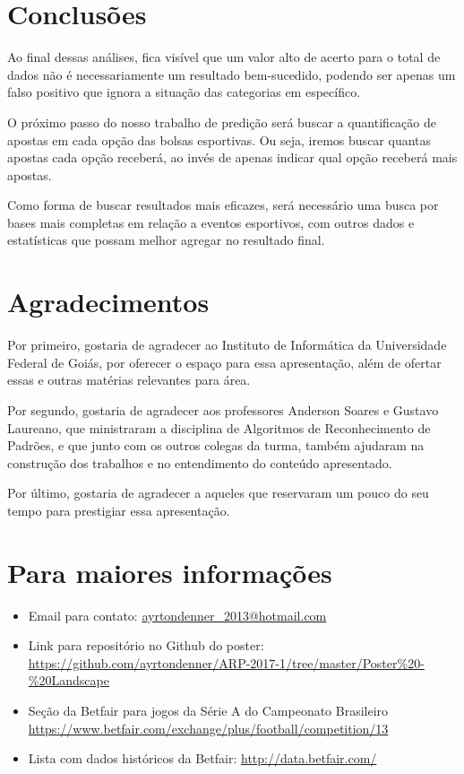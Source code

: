 \documentclass[thesis]{hmcposter}
\begin{document}
\begin{poster}
\section{Conclusões}

Ao final dessas análises, fica visível que um valor alto de acerto para o total de dados não é necessariamente um resultado bem-sucedido, podendo ser apenas um falso positivo que ignora a situação das categorias em específico.

O próximo passo do nosso trabalho de predição será buscar a quantificação de apostas em cada opção das bolsas esportivas. Ou seja, iremos buscar quantas apostas cada opção receberá, ao invés de apenas indicar qual opção receberá mais apostas.

Como forma de buscar resultados mais eficazes, será necessário uma busca por bases mais completas em relação a eventos esportivos, com outros dados e estatísticas que possam melhor agregar no resultado final.

\section{Agradecimentos}

Por primeiro, gostaria de agradecer ao Instituto de Informática da Universidade Federal de Goiás, por oferecer o espaço para essa apresentação, além de ofertar essas e outras matérias relevantes para área.

Por segundo, gostaria de agradecer aos professores Anderson Soares e Gustavo Laureano, que ministraram a disciplina de Algoritmos de Reconhecimento de Padrões, e que junto com os outros colegas da turma, também ajudaram na construção dos trabalhos e no entendimento do conteúdo apresentado.

Por último, gostaria de agradecer a aqueles que reservaram um pouco do seu tempo para prestigiar essa apresentação.

\section{Para maiores informações}

\begin{itemize}
\item Email para contato: \url{ayrtondenner_2013@hotmail.com}
\item Link para repositório no Github do poster: \url{https://github.com/ayrtondenner/ARP-2017-1/tree/master/Poster%20-%20Landscape}
\item Seção da Betfair para jogos da Série A do Campeonato Brasileiro \url{https://www.betfair.com/exchange/plus/football/competition/13}
\item Lista com dados históricos da Betfair: \url{http://data.betfair.com/}
\end{itemize}

\end{poster}
\end{document}
